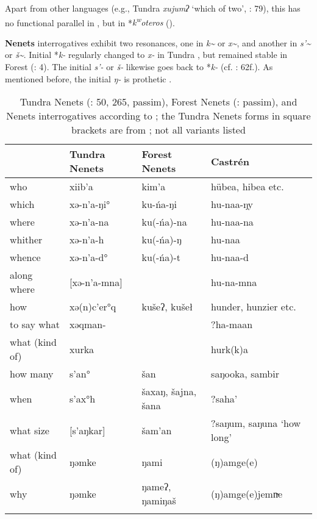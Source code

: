 Apart from other  languages (e.g., Tundra  \textit{xujumʔ} ‘which of two’, \citealt{Mus2015b}: 79), this  has no functional parallel in , but in  *\textit{k\textsuperscript{w}}\textit{oteros} ().

\textbf{Nenets} interrogatives exhibit two resonances, one in \textit{k{\textasciitilde}} or \textit{x{\textasciitilde}}, and another in \textit{s’{\textasciitilde}} or \textit{š{\textasciitilde}}. Initial *\textit{k-} regularly changed to \textit{x-} in Tundra , but remained stable in Forest  (\citealt{Hajdú1988}: 4). The initial \textit{s’-} or \textit{š-} likewise goes back to *\textit{k-} (cf. \citealt{Janhunen1977}: 62f.). As mentioned before, the initial \textit{ŋ-} is prothetic \citep[466]{Janhunen1998}.

\begin{table}
\caption{Tundra Nenets (\citealt{Nikolaeva2014}: 50, 265, passim), Forest Nenets (\citealt{Mus2013}: passim), and {Nenets} interrogatives according to \cite[3, 10, 32, 327]{Castrén1855}; the Tundra Nenets forms in square brackets are from \cite{Mus2013,Mus2015b}; not all variants listed}
\label{tab:ural:7}

\begin{tabularx}{\textwidth}{Xlll}
\lsptoprule
& \textbf{Tundra Nenets} & \textbf{Forest Nenets} & \textbf{Castrén}\\
\midrule
who & xiib’a & kim’a & hübea, hibea etc.\\
which & xə-n’a-ŋi° & ku-ńa-ŋi & hu-naa-ŋy\\
where & xə-n’a-na & ku(-ńa)-na & hu-naa-na\\
whither & xə-n’a-h & ku(-ńa)-ŋ & hu-naa\\
whence & xə-n’a-d° & ku(-ńa)-t & hu-naa-d\\
along where & [xə-n’a-mna] &  & hu-na-mna\\
how & xə(n)c’er°q & kušeʔ, kušeł & hunder, hunzier etc.\\
to say what & xəqman- &  & ?ha-maan\\
what (kind of) & xurka &  & hurk(k)a\\
how many & s’an° & šan & saŋooka, sambir\\
when & s’ax°h & šaxaŋ, šajna, šana & ?saha’\\
what size & [s’aŋkar] & šam’an & ?saŋum, saŋuna ‘how long’\\
what (kind of) & ŋəmke & ŋami & (ŋ)amge(e)\\
why & ŋəmke & ŋameʔ, ŋamiŋaš & (ŋ)amge(e)jemn̴e\\
\lspbottomrule
\end{tabularx}
\end{table}


